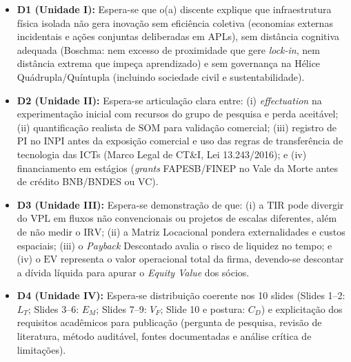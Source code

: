 \begin{boxGabarito}
\begin{itemize}[leftmargin=1.4em, itemsep=4pt]
  \item \textbf{D1 (Unidade I):} Espera-se que o(a) discente explique que infraestrutura física isolada não gera inovação sem eficiência coletiva (economias externas incidentais e ações conjuntas deliberadas em APLs), sem distância cognitiva adequada (Boschma: nem excesso de proximidade que gere \textit{lock-in}, nem distância extrema que impeça aprendizado) e sem governança na Hélice Quádrupla/Quíntupla (incluindo sociedade civil e sustentabilidade).
  \item \textbf{D2 (Unidade II):} Espera-se articulação clara entre: (i) \textit{effectuation} na experimentação inicial com recursos do grupo de pesquisa e perda aceitável; (ii) quantificação realista de $\text{SOM}$ para validação comercial; (iii) registro de PI no INPI antes da exposição comercial e uso das regras de transferência de tecnologia das ICTs (Marco Legal de CT\&I, Lei 13.243/2016); e (iv) financiamento em estágios (\textit{grants} FAPESB/FINEP no Vale da Morte antes de crédito BNB/BNDES ou VC).
  \item \textbf{D3 (Unidade III):} Espera-se demonstração de que: (i) a $\text{TIR}$ pode divergir do $\text{VPL}$ em fluxos não convencionais ou projetos de escalas diferentes, além de não medir o $\text{IRV}$; (ii) a Matriz Locacional pondera externalidades e custos espaciais; (iii) o \textit{Payback} Descontado avalia o risco de liquidez no tempo; e (iv) o $\text{EV}$ representa o valor operacional total da firma, devendo-se descontar a dívida líquida para apurar o \textit{Equity Value} dos sócios.
  \item \textbf{D4 (Unidade IV):} Espera-se distribuição coerente nos 10 slides (Slides 1–2: $L_T$; Slides 3–6: $E_M$; Slides 7–9: $V_F$; Slide 10 e postura: $C_D$) e explicitação dos requisitos acadêmicos para publicação (pergunta de pesquisa, revisão de literatura, método auditável, fontes documentadas e análise crítica de limitações).
\end{itemize}
\end{boxGabarito}


